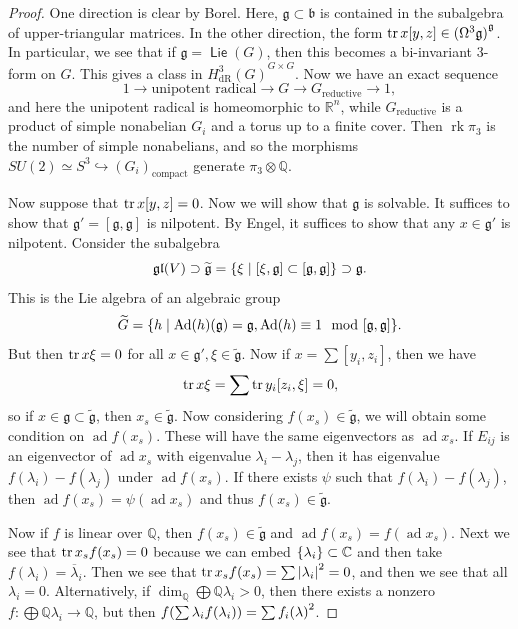 \documentclass[leqno, openany]{memoir}
\theoremstyle{definition}
\theoremstyle{remark}
\theoremstyle{plain}
\theoremstyle{definition}
\theoremstyle{remark}
\newcommand{\R}{\mathbb{R}}
\newcommand{\C}{\mathbb{C}}
\newcommand{\Q}{\mathbb{Q}}
\newcommand{\mf}[1]{\mathfrak{#1}}
\newcommand{\mr}[1]{\mathrm{#1}}
\newcommand{\ol}[1]{\overline{#1}}
\newcommand{\wtl}[1]{\widetilde{#1}}
\DeclareMathOperator{\ad}{ad}
\DeclareMathOperator{\Ad}{Ad}
\DeclareMathOperator{\Lie}{\mathsf{Lie}}
\begin{document}
\begin{proof} One direction is clear by Borel. Here, $\mf{g} \subset \mf{b}$ is
    contained in the subalgebra of upper-triangular matrices. In the other
    direction, the form $\trace x[y,z] \in { ( \Omega^3 \mf{g} ) }^{\mf{g}}$.
    In particular, we see that if $\mf{g} = \Lie(G)$, then this becomes a
    bi-invariant $3$-form on $G$. This gives a class in ${H^3_{\mr{dR}}(G)}^{G
    \times G}$. Now we have an exact sequence \[ 1 \to \text{unipotent radical}
    \to G \to G_{\text{reductive}} \to 1, \] and here the unipotent radical is
    homeomorphic to $\R^n$, while $G_{\text{reductive}}$ is a product of simple
    nonabelian $G_i$ and a torus up to a finite cover. Then $\operatorname{rk}
    \pi_3$ is the number of simple nonabelians, and so the morphisms $SU(2)
    \simeq S^3 \hookrightarrow {(G_i)}_{\text{compact}}$ generate $\pi_3
    \otimes \Q$.

    Now suppose that $\trace x[y,z] = 0$. Now we will show that $\mf{g}$ is
    solvable. It suffices to show that $\mf{g}' = [\mf{g}, \mf{g}]$ is
    nilpotent. By Engel, it suffices to show that any $x \in \mf{g}'$ is
    nilpotent. Consider the subalgebra \[ \mf{gl}(V) \supset \wtl{\mf{g}} =
    \qty{ \xi \mid [\xi, \mf{g}] \subset [\mf{g}, \mf{g}] } \supset \mf{g}. \]
    This is the Lie algebra of an algebraic group \[ \wtl{G} = \qty{h \mid \Ad
    (h) (\mf{g}) = \mf{g}, \Ad (h) \equiv 1 \mod [\mf{g}, \mf{g}]}. \] But then
    $\tr x \xi = 0$ for all $x \in \mf{g}', \xi \in \wtl{\mf{g}}$. Now if $x =
    \sum [y_i, z_i]$, then we have \[ \tr x \xi = \sum \tr y_i [z_i, \xi] = 0,
    \] so if $x \in \mf{g} \subset \wtl{\mf{g}}$, then $x_s \in \wtl{\mf{g}}$.
    Now considering $f(x_s) \in \wtl{\mf{g}}$, we will obtain some condition on
    $\ad f(x_s)$. These will have the same eigenvectors as $\ad x_s$. If
    $E_{ij}$ is an eigenvector of $\ad x_s$ with eigenvalue $\lambda_i -
    \lambda_j$, then it has eigenvalue $f(\lambda_i) - f(\lambda_j)$ under $\ad
    f(x_s)$. If there exists $\psi$ such that $f(\lambda_i) - f(\lambda_j)$,
    then $\ad f(x_s) = \psi(\ad x_s)$ and thus $f(x_s) \in \wtl{\mf{g}}$.

    Now if $f$ is linear over $\Q$, then $f(x_s) \in \wtl{\mf{g}}$ and $\ad
f(x_s) = f(\ad x_s)$. Next we see that $\tr x_s f(x_s) = 0$ because we can
embed $\qty{\lambda_i} \subset \C$ and then take $f(\lambda_i) =
\ol{\lambda}_i$. Then we see that $\tr x_s f(x_s) = \sum \abs{\lambda_i}^2 =
0$, and then we see that all $\lambda_i = 0$. Alternatively, if $\dim_{\Q}
\bigoplus \Q \lambda_i > 0$, then there exists a nonzero $f \colon \bigoplus \Q
\lambda_i \to \Q$, but then $f \qty(\sum \lambda_i f(\lambda_i)) = \sum
{f_i(\lambda)}^2$.  \end{proof}
\end{document}

